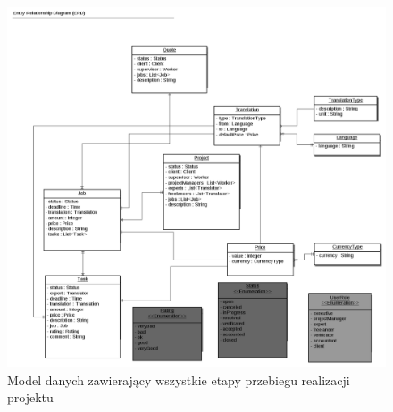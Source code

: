 \documentclass[licencjacka]{pracamgr}
\begin{document}
\begin{figure}[h!]
\includegraphics[width=1.1\textwidth]{resources/data.png}
\caption{Model danych zawierający wszystkie etapy przebiegu realizacji projektu}
\end{figure}
\end{document}
